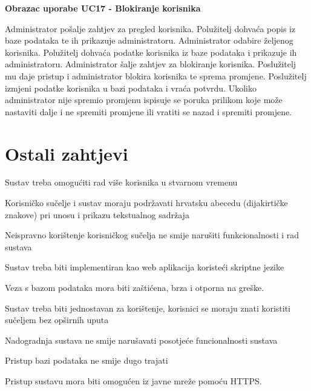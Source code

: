 				
				\eject
				
				\textbf{Obrazac uporabe UC17 - Blokiranje korisnika}
				
				\text 	Administrator pošalje zahtjev za pregled korisnika. Polužitelj dohvaća popis iz baze podataka te ih prikazuje administratoru. Administrator odabire željenog korisnika. Polužitelj dohvaća podatke korisnika iz baze podataka i prikazuje ih administratoru. Administrator šalje zahtjev za blokiranje korisnika. Poslužitelj mu daje pristup i administrator blokira korisnika te sprema promjene. Poslužitelj izmjeni podatke korisnika u bazi podataka i vraća potvrdu. Ukoliko administrator nije spremio promjenu ispisuje se poruka prilikom koje može nastaviti dalje i ne spremiti promjene ili vratiti se nazad i spremiti promjene.
				
				
				\eject
	
		\section{Ostali zahtjevi}
		
%		 
%			 

		\begin{packed_item}
		
			\item Sustav treba omogućiti rad više korisnika u stvarnom vremenu
			\item 	Korisničko sučelje i sustav moraju podržavati hrvatsku abecedu (dijakirtičke znakove) pri unosu i prikazu tekstualnog sadržaja
			\item Neispravno korištenje korisničkog sučelja ne smije narušiti funkcionalnosti i rad sustava
			\item Sustav treba biti implementiran kao web aplikacija koristeći skriptne jezike
			\item Veza s bazom podataka mora biti zaštićena, brza i otporna na greške.
			\item Sustav treba biti jednostavan za korištenje, korisnici se moraju znati koristiti sučeljem bez opširnih uputa
			\item Nadogradnja sustava ne smije narušavati posotjeće funcionalnosti sustava
			\item Pristup bazi podataka ne smije dugo trajati
			\item Pristup sustavu mora biti omogućen iz javne mreže pomoću HTTPS.
		
		\end{packed_item}
			 
			 
	
